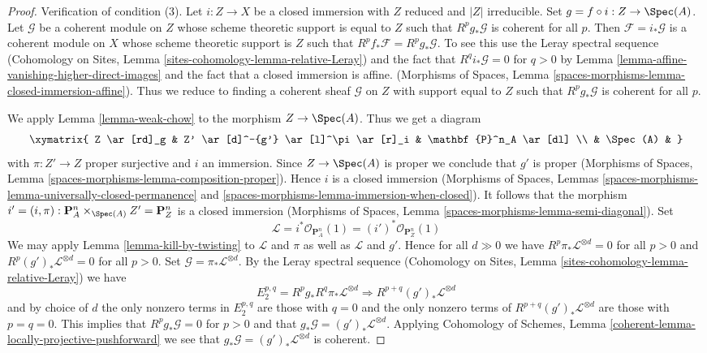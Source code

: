 \begin{proof}
\medskip\noindent
Verification of condition (3). Let $i : Z \to X$ be a closed immersion
with $Z$ reduced and $|Z|$ irreducible. Set $g = f \circ i : Z \to \Spec(A)$.
Let $\mathcal{G}$ be a coherent module on $Z$ whose scheme theoretic support
is equal to $Z$ such that $R^pg_*\mathcal{G}$ is coherent for all $p$.
Then $\mathcal{F} = i_*\mathcal{G}$ is a coherent module on
$X$ whose scheme theoretic support is $Z$ such that
$R^pf_*\mathcal{F} = R^pg_*\mathcal{G}$. To see this use
the Leray spectral sequence
(Cohomology on Sites, Lemma \ref{sites-cohomology-lemma-relative-Leray})
and the fact that $R^qi_*\mathcal{G} = 0$ for $q > 0$ by
Lemma \ref{lemma-affine-vanishing-higher-direct-images}
and the fact that a closed immersion is affine.
(Morphisms of Spaces, Lemma
\ref{spaces-morphisms-lemma-closed-immersion-affine}).
Thus we reduce to finding a coherent sheaf $\mathcal{G}$ on $Z$
with support equal to $Z$ such that $R^pg_*\mathcal{G}$ is coherent
for all $p$.

\medskip\noindent
We apply Lemma \ref{lemma-weak-chow} to the morphism $Z \to \Spec(A)$.
Thus we get a diagram
$$
\xymatrix{
Z \ar[rd]_g & Z' \ar[d]^-{g'} \ar[l]^\pi \ar[r]_i & \mathbf{P}^n_A \ar[dl] \\
& \Spec(A) &
}
$$
with $\pi : Z' \to Z$ proper surjective and $i$ an immersion.
Since $Z \to \Spec(A)$ is proper we conclude that $g'$ is proper
(Morphisms of Spaces, Lemma \ref{spaces-morphisms-lemma-composition-proper}).
Hence $i$ is a closed immersion
(Morphisms of Spaces, Lemmas
\ref{spaces-morphisms-lemma-universally-closed-permanence} and
\ref{spaces-morphisms-lemma-immersion-when-closed}).
It follows that the morphism
$i' = (i, \pi) : \mathbf{P}^n_A \times_{\Spec(A)} Z' = \mathbf{P}^n_Z$ is
a closed immersion
(Morphisms of Spaces, Lemma \ref{spaces-morphisms-lemma-semi-diagonal}).
Set
$$
\mathcal{L} =
i^*\mathcal{O}_{\mathbf{P}^n_A}(1) =
(i')^*\mathcal{O}_{\mathbf{P}^n_Z}(1)
$$
We may apply Lemma \ref{lemma-kill-by-twisting}
to $\mathcal{L}$ and $\pi$ as well as $\mathcal{L}$ and $g'$.
Hence for all $d \gg 0$ we have
$R^p\pi_*\mathcal{L}^{\otimes d} = 0$ for all $p > 0$ and
$R^p(g')_*\mathcal{L}^{\otimes d} = 0$ for all $p > 0$.
Set $\mathcal{G} = \pi_*\mathcal{L}^{\otimes d}$.
By the Leray spectral sequence
(Cohomology on Sites, Lemma \ref{sites-cohomology-lemma-relative-Leray})
we have
$$
E_2^{p, q} = R^pg_* R^q\pi_*\mathcal{L}^{\otimes d}
\Rightarrow
R^{p + q}(g')_*\mathcal{L}^{\otimes d}
$$
and by choice of $d$ the only nonzero terms in $E_2^{p, q}$ are
those with $q = 0$ and the only nonzero terms of
$R^{p + q}(g')_*\mathcal{L}^{\otimes d}$ are those with $p = q = 0$.
This implies that $R^pg_*\mathcal{G} = 0$ for $p > 0$ and
that $g_*\mathcal{G} = (g')_*\mathcal{L}^{\otimes d}$.
Applying
Cohomology of Schemes, Lemma
\ref{coherent-lemma-locally-projective-pushforward}
we see that $g_*\mathcal{G} = (g')_*\mathcal{L}^{\otimes d}$ is
coherent.


\end{proof}
